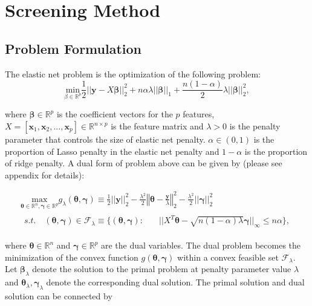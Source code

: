 

\section{Screening Method}
\subsection{Problem Formulation}

The elastic net problem is the optimization of the following problem:
\begin{equation}
    \label{eq:enet}
    \underset{\beta\in \mathbb{R}^p}{\mathrm{min}}\frac{1}{2}||\boldsymbol y-X\boldsymbol\beta||_2^2+n\alpha\lambda||\boldsymbol\beta||_1+\frac{n(1-\alpha)}{2}\lambda||\boldsymbol\beta||_2^2,
\end{equation}

where $\boldsymbol\beta\in\mathbb{R}^p$ is the coefficient vectors for the $p$ features, $X=[\boldsymbol x_1,\boldsymbol x_2,...,\boldsymbol x_p]\in\mathbb{R}^{n\times p}$ is the feature matrix and $\lambda>0$ is the penalty parameter that controls the size of elastic net penalty. $\alpha\in(0,1)$ is the proportion of Lasso penalty in the elastic net penalty and $1-\alpha$ is the proportion of ridge penalty. A dual form of problem above can be given by (please see appendix for details):

\begin{gather}
        \label{eq:dualtheta}
        \underset{\boldsymbol\theta\in \mathbb{R}^{ n},\boldsymbol\gamma\in\mathbb{R}^p}{\mathrm{max}}g_\lambda(\boldsymbol\theta,\boldsymbol\gamma)\equiv\frac{1}{2}||\boldsymbol y||_2^2-\frac{\lambda^2}{2}\left\Vert\boldsymbol\theta-\frac{\boldsymbol y}{\lambda}\right\Vert_2^2-\frac{\lambda^2}{2}||\boldsymbol\gamma||_2^2\\
        \begin{aligned}s.t.\quad (\boldsymbol\theta,\boldsymbol\gamma)\in \mathcal{F}_\lambda\equiv\{(\boldsymbol\theta,\boldsymbol\gamma):\quad
            &||X^T\boldsymbol\theta-\sqrt{n(1-\alpha)\lambda}\boldsymbol\gamma||_\infty\leq n\alpha\}\nonumber,
        \end{aligned}
\end{gather}

where $\boldsymbol\theta\in \mathbb{R}^{n}$ and $\boldsymbol\gamma\in\mathbb{R}^p$ are the dual variables. The dual problem becomes the minimization of the convex function $g(\boldsymbol\theta,\boldsymbol
\gamma)$ within a convex feasible set $\mathcal{F}_\lambda$. Let $\boldsymbol\beta_\lambda$ denote the solution to the primal problem at penalty parameter value $\lambda$ and $\boldsymbol\theta_{\lambda},\boldsymbol\gamma_\lambda$ denote the corresponding dual solution. The primal solution and dual solution can be connected by

